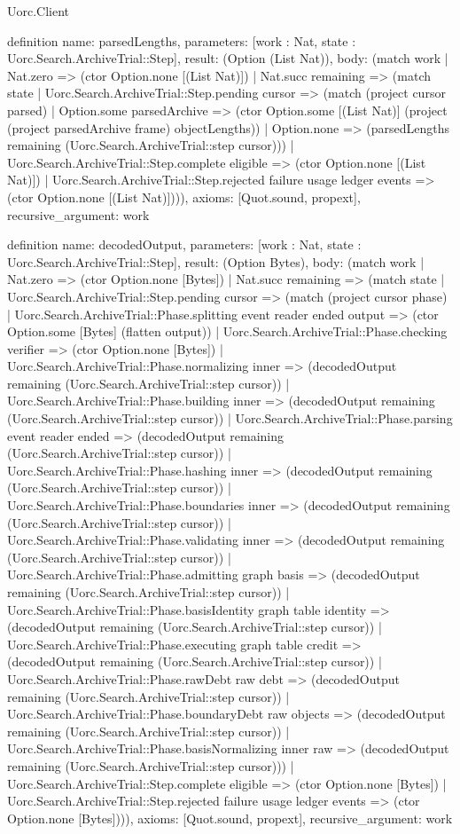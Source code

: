 \begin{lexlean}{Uorc.Client}
\begin{semanticmodule}
definition{
  name: parsedLengths,
  parameters: [work : Nat, state : Uorc.Search.ArchiveTrial::Step],
  result: (Option (List Nat)),
  body: (match work
    | Nat.zero => (ctor Option.none [(List Nat)])
    | Nat.succ remaining => (match state
      | Uorc.Search.ArchiveTrial::Step.pending cursor => (match (project cursor parsed)
        | Option.some parsedArchive => (ctor Option.some [(List Nat)] (project (project parsedArchive frame) objectLengths))
        | Option.none => (parsedLengths remaining (Uorc.Search.ArchiveTrial::step cursor)))
      | Uorc.Search.ArchiveTrial::Step.complete eligible => (ctor Option.none [(List Nat)])
      | Uorc.Search.ArchiveTrial::Step.rejected failure usage ledger events => (ctor Option.none [(List Nat)]))),
  axioms: [Quot.sound, propext],
  recursive_argument: work
}

definition{
  name: decodedOutput,
  parameters: [work : Nat, state : Uorc.Search.ArchiveTrial::Step],
  result: (Option Bytes),
  body: (match work
    | Nat.zero => (ctor Option.none [Bytes])
    | Nat.succ remaining => (match state
      | Uorc.Search.ArchiveTrial::Step.pending cursor => (match (project cursor phase)
        | Uorc.Search.ArchiveTrial::Phase.splitting event reader ended output => (ctor Option.some [Bytes] (flatten output))
        | Uorc.Search.ArchiveTrial::Phase.checking verifier => (ctor Option.none [Bytes])
        | Uorc.Search.ArchiveTrial::Phase.normalizing inner => (decodedOutput remaining (Uorc.Search.ArchiveTrial::step cursor))
        | Uorc.Search.ArchiveTrial::Phase.building inner => (decodedOutput remaining (Uorc.Search.ArchiveTrial::step cursor))
        | Uorc.Search.ArchiveTrial::Phase.parsing event reader ended => (decodedOutput remaining (Uorc.Search.ArchiveTrial::step cursor))
        | Uorc.Search.ArchiveTrial::Phase.hashing inner => (decodedOutput remaining (Uorc.Search.ArchiveTrial::step cursor))
        | Uorc.Search.ArchiveTrial::Phase.boundaries inner => (decodedOutput remaining (Uorc.Search.ArchiveTrial::step cursor))
        | Uorc.Search.ArchiveTrial::Phase.validating inner => (decodedOutput remaining (Uorc.Search.ArchiveTrial::step cursor))
        | Uorc.Search.ArchiveTrial::Phase.admitting graph basis => (decodedOutput remaining (Uorc.Search.ArchiveTrial::step cursor))
        | Uorc.Search.ArchiveTrial::Phase.basisIdentity graph table identity => (decodedOutput remaining (Uorc.Search.ArchiveTrial::step cursor))
        | Uorc.Search.ArchiveTrial::Phase.executing graph table credit => (decodedOutput remaining (Uorc.Search.ArchiveTrial::step cursor))
        | Uorc.Search.ArchiveTrial::Phase.rawDebt raw debt => (decodedOutput remaining (Uorc.Search.ArchiveTrial::step cursor))
        | Uorc.Search.ArchiveTrial::Phase.boundaryDebt raw objects => (decodedOutput remaining (Uorc.Search.ArchiveTrial::step cursor))
        | Uorc.Search.ArchiveTrial::Phase.basisNormalizing inner raw => (decodedOutput remaining (Uorc.Search.ArchiveTrial::step cursor)))
      | Uorc.Search.ArchiveTrial::Step.complete eligible => (ctor Option.none [Bytes])
      | Uorc.Search.ArchiveTrial::Step.rejected failure usage ledger events => (ctor Option.none [Bytes]))),
  axioms: [Quot.sound, propext],
  recursive_argument: work
}


\end{semanticmodule}
\end{lexlean}
